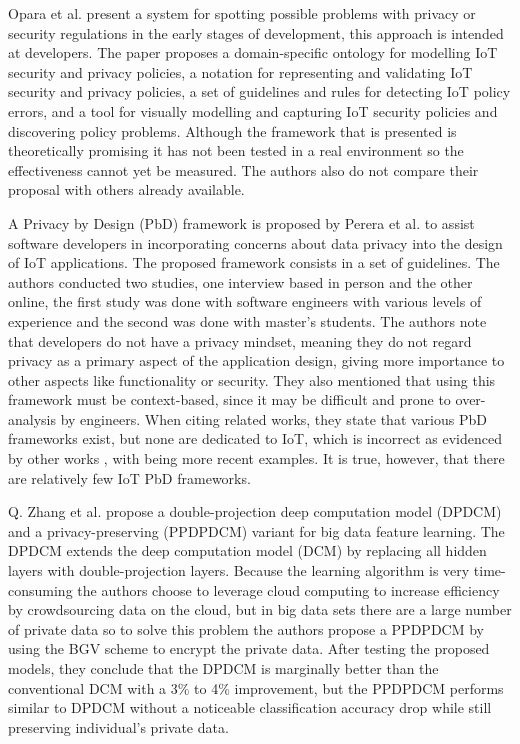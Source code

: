 Opara et al. \cite{opara2022framework} present a system for spotting possible
problems with privacy or security regulations in the early stages of development,
this approach is intended at developers. The paper proposes a domain-specific
ontology for modelling IoT security and privacy policies, a notation for
representing and validating IoT security and privacy policies, a set of
guidelines and rules for detecting IoT policy errors, and a tool for visually
modelling and capturing IoT security policies and discovering policy problems.
Although the framework that is presented is theoretically promising it has
not been tested in a real environment so the effectiveness cannot yet be
measured. The authors also do not compare their proposal with others already
available.

A Privacy by Design (PbD) framework is proposed by Perera et al. \cite{perera2020designing}
to assist software developers in incorporating concerns about data privacy
into the design of IoT applications. The proposed framework consists in
a set of guidelines. The authors conducted two studies, one interview based
in person and the other online, the first study was done with software engineers with
various levels of experience and the second was done with master's students.
The authors note that developers do not have a privacy mindset, meaning
they do not regard privacy as a primary aspect of the application design,
giving more importance to other aspects like functionality or security.
They also mentioned that using this framework must be context-based, since
it may be difficult and prone to over-analysis by engineers. When citing
related works, they state that various PbD frameworks exist, but none are dedicated
to IoT, which is incorrect as evidenced by other works \cite{o2017privacy, cavoukian2016embedding},
with \cite{alkhariji2023semantics, aljeraisy2021privacy} being more recent
examples. It is true, however, that there are relatively few IoT PbD frameworks.

Q. Zhang et al. \cite{zhang2017privacy} propose a double-projection deep
computation model (DPDCM) and a privacy-preserving (PPDPDCM) variant for
big data feature learning. The DPDCM extends the deep computation model
(DCM) by replacing all hidden layers with double-projection layers.
Because the learning algorithm is very time-consuming the authors choose
to leverage cloud computing to increase efficiency by crowdsourcing data
on the cloud, but in big data sets there are a large number of private data
so to solve this problem the authors propose a PPDPDCM by using the BGV
scheme to encrypt the private data. After testing the proposed models,
they conclude that the DPDCM is marginally better than the conventional DCM
with a 3\% to 4\% improvement, but the PPDPDCM performs similar to DPDCM
without a noticeable classification accuracy drop while still preserving
individual's private data.

